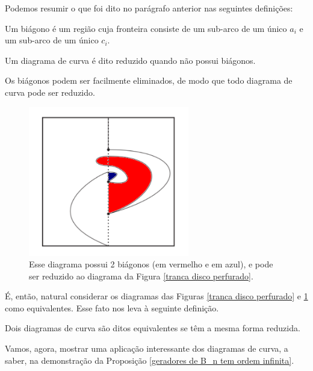 	\par\vspace{0.3cm} Podemos resumir o que foi dito no parágrafo anterior nas seguintes definições:
	\begin{definition}
	\label{def biagono}
		Um biágono é um região cuja fronteira consiste de um sub-arco de um único $a_i$ e um 
		sub-arco de um único $c_i$.
	\end{definition}
	\begin{definition}
	\label{def reducao}
		Um diagrama de curva é dito reduzido quando não possui biágonos.
	\end{definition}
	Os biágonos podem ser facilmente eliminados, de modo que todo diagrama de curva pode ser reduzido. 
	\begin{figure}[H]
	\begin{center}
		\includegraphics[width=7cm]{Images/biagonos.png}
	\end{center}\caption{Esse diagrama possui 2 biágonos (em vermelho e em azul), e 
	pode ser reduzido ao diagrama da Figura \ref{tranca disco perfurado}.}
	\label{diagrama nao reduzido com biagonos}
	\end{figure}
	É, então, natural considerar os diagramas das 
	Figuras \ref{tranca disco perfurado} e \ref{diagrama nao reduzido com biagonos} como equivalentes. 
	Esse fato nos leva à seguinte definição.
	\begin{definition}
	\label{def equivalencia diagramas}
		Dois diagramas de curva são ditos equivalentes se têm a mesma forma reduzida.
	\end{definition} 
	Vamos, agora, mostrar uma aplicação interessante dos diagramas de curva, a saber, na demonstração da Proposição \ref{geradores de B_n tem ordem infinita}.
	
